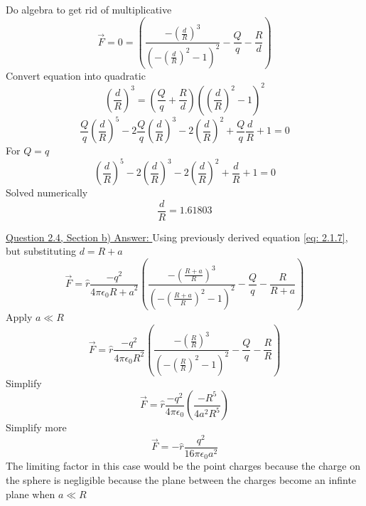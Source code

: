 \documentclass[12pt]{article}
\begin{document}
    Do algebra to get rid of multiplicative
    \begin{equation} \label{eq: 2.1.9}
        \vec{F} = 0 = \left(\frac{-\left(\frac{d}{R} \right)^3}{\left(-\left(\frac{d}{R} \right)^2 - 1 \right)^2} - \frac{Q}{q} - \frac{R}{d} \right)
    \end{equation}
    Convert equation into quadratic
    \begin{equation} \label{eq: 2.1.10}
        \left(\frac{d}{R} \right)^3 = \left(\frac{Q}{q} + \frac{R}{d}\right) \left(\left(\frac{d}{R} \right)^2 - 1 \right)^2
    \end{equation}
    \begin{equation} \label{eq: 2.1.11}
        \frac{Q}{q} \left(\frac{d}{R} \right)^5 - 2 \frac{Q}{q} \left(\frac{d}{R} \right)^3 - 2 \left(\frac{d}{R} \right)^2 + \frac{Q}{q} \frac{d}{R} + 1 = 0
    \end{equation}
    For $Q=q$
    \begin{equation} \label{eq: 2.1.11}
        \left(\frac{d}{R} \right)^5 - 2 \left(\frac{d}{R} \right)^3 - 2 \left(\frac{d}{R} \right)^2 + \frac{d}{R} + 1 = 0
    \end{equation}
    Solved numerically
    \begin{equation} \label{eq: 2.1.12}
        \frac{d}{R} = 1.61803
    \end{equation}

    \underline{Question 2.4, Section b) Answer: }
    \newline 
    Using previously derived equation \ref{eq: 2.1.7}, but substituting $d=R+a$
    \begin{equation} \label{eq: 2.2.1}
        \vec{F} = \hat{r} \frac{-q^2}{4 \pi \epsilon_0 {R+a}^2} \left(\frac{-\left(\frac{R+a}{R} \right)^3}{\left(-\left(\frac{R+a}{R} \right)^2 - 1 \right)^2} - \frac{Q}{q} - \frac{R}{R+a} \right)
    \end{equation}    
    Apply $a \ll R$
    \begin{equation} \label{eq: 2.2.2}
        \vec{F} = \hat{r} \frac{-q^2}{4 \pi \epsilon_0 {R}^2} \left(\frac{-\left(\frac{R}{R} \right)^3}{\left(-\left(\frac{R}{R} \right)^2 - 1 \right)^2} - \frac{Q}{q} - \frac{R}{R} \right)
    \end{equation}        
    Simplify
    \begin{equation} \label{eq: 2.2.3}
        \vec{F} = \hat{r} \frac{-q^2}{4 \pi \epsilon_0} \left(\frac{-R^5}{4 a^2 R^5} \right)
    \end{equation}
    Simplify more
    \begin{equation}
        \vec{F} = - \hat{r} \frac{q^2}{16 \pi \epsilon_0 a^2}
    \end{equation}
    The limiting factor in this case would be the point charges because the charge on the sphere is negligible because the plane between the charges become an infinte plane when $a \ll R$
    
\end{document}
